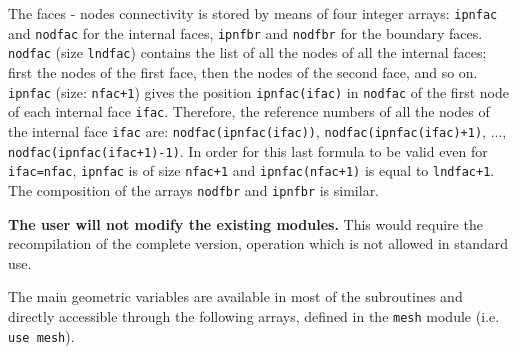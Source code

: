 {{{\label{sec:prg_nodfac}
The faces - nodes connectivity is stored by
means of four integer arrays: \texttt{ipnfac} and \texttt{nodfac} for the
internal faces, \texttt{ipnfbr} and \texttt{nodfbr} for the boundary faces.
\texttt{nodfac} (size \texttt{lndfac})
contains the list of all the nodes of all the internal faces; first the nodes of
the first face, then the nodes of the second face, and so on.
\texttt{ipnfac} (size: \texttt{nfac+1}) gives the position \texttt{ipnfac(ifac)}
in \texttt{nodfac} of the first node of each internal face \texttt{ifac}.
Therefore, the reference numbers of all
the nodes of the internal face \texttt{ifac} are: \texttt{nodfac(ipnfac(ifac))},
\texttt{nodfac(ipnfac(ifac)+1)}, ..., \texttt{nodfac(ipnfac(ifac+1)-1)}.
In order for this last formula to be valid even for \texttt{ifac=nfac},
\texttt{ipnfac} is of size \texttt{nfac+1} and \texttt{ipnfac(nfac+1)}
is equal to \texttt{lndfac+1}.\\
The composition of the arrays \texttt{nodfbr} and \texttt{ipnfbr} is similar.

{\bf The user will not modify the existing modules.} This would require the
recompilation of the complete version, operation which is not allowed in
standard use.


The main geometric variables are available in most of the
subroutines and directly accessible through the following arrays,
defined in the \texttt{mesh} module (i.e. \texttt{use mesh}).







}}}
